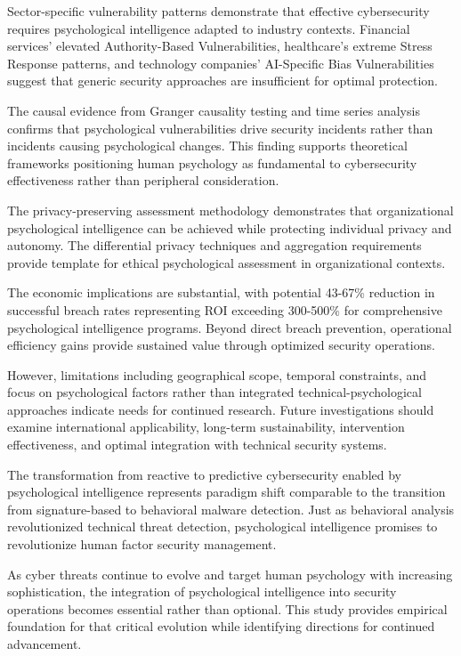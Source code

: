 \documentclass[10pt, twocolumn]{article}
\begin{document}
Sector-specific vulnerability patterns demonstrate that effective cybersecurity requires psychological intelligence adapted to industry contexts. Financial services' elevated Authority-Based Vulnerabilities, healthcare's extreme Stress Response patterns, and technology companies' AI-Specific Bias Vulnerabilities suggest that generic security approaches are insufficient for optimal protection.

The causal evidence from Granger causality testing and time series analysis confirms that psychological vulnerabilities drive security incidents rather than incidents causing psychological changes. This finding supports theoretical frameworks positioning human psychology as fundamental to cybersecurity effectiveness rather than peripheral consideration.

The privacy-preserving assessment methodology demonstrates that organizational psychological intelligence can be achieved while protecting individual privacy and autonomy. The differential privacy techniques and aggregation requirements provide template for ethical psychological assessment in organizational contexts.

The economic implications are substantial, with potential 43-67\% reduction in successful breach rates representing ROI exceeding 300-500\% for comprehensive psychological intelligence programs. Beyond direct breach prevention, operational efficiency gains provide sustained value through optimized security operations.

However, limitations including geographical scope, temporal constraints, and focus on psychological factors rather than integrated technical-psychological approaches indicate needs for continued research. Future investigations should examine international applicability, long-term sustainability, intervention effectiveness, and optimal integration with technical security systems.

The transformation from reactive to predictive cybersecurity enabled by psychological intelligence represents paradigm shift comparable to the transition from signature-based to behavioral malware detection. Just as behavioral analysis revolutionized technical threat detection, psychological intelligence promises to revolutionize human factor security management.

As cyber threats continue to evolve and target human psychology with increasing sophistication, the integration of psychological intelligence into security operations becomes essential rather than optional. This study provides empirical foundation for that critical evolution while identifying directions for continued advancement.
\end{document}
